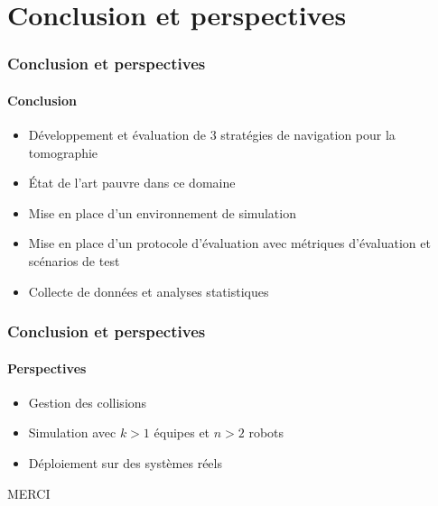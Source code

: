 \documentclass{beamer}
\begin{document}
	\section{Conclusion et perspectives}
		\begin{frame}
			\frametitle{Conclusion et perspectives}
			\framesubtitle{Conclusion}
			\begin{itemize}
				\item Développement et évaluation de 3 stratégies de navigation pour la tomographie
				\item État de l'art pauvre dans ce domaine
				\item Mise en place d'un environnement de simulation
				\item Mise en place d'un protocole d'évaluation avec métriques d'évaluation et scénarios de test
				\item Collecte de données et analyses statistiques
			\end{itemize}
		\end{frame}
		\begin{frame}
			\frametitle{Conclusion et perspectives}
			\framesubtitle{Perspectives}
			\begin{itemize}
				\item Gestion des collisions
				\item Simulation avec $k > 1$ équipes et $n > 2$ robots
				\item Déploiement sur des systèmes réels
			\end{itemize}
		\end{frame}
		\begin{frame}
			\huge
			\begin{center}
				MERCI
			\end{center}
		\end{frame}
\end{document}
